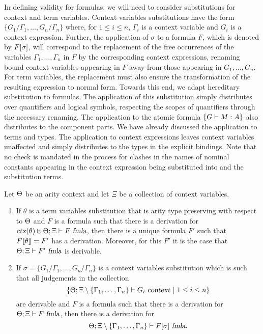 In defining validity for formulas, we will need to consider
substitutions for context and term variables.
%
Context variables substitutions have the form
$\{G_1/\Gamma_1,\ldots,G_n/\Gamma_n\}$ where, for $1 \leq i \leq n$,
$\Gamma_i$ is a context variable and $G_i$ is a context expression. 
%
Further, the application of $\sigma$ to a formula
$F$, which is denoted by $F[\sigma]$, will correspond to the 
replacement of the free occurrences of the variables
$\Gamma_1,\ldots,\Gamma_n$ in $F$ by the corresponding context
expressions, renaming bound context variables appearing in $F$ away
from those appearing in $G_1,\ldots,G_n$.
%
For term variables, the replacement must also ensure the
transformation of the resulting expression to normal form.
%
Towards this end, we adapt hereditary substitution to formulas.
%
The application of this substitution simply distributes over
quantifiers and logical symbols, respecting the scopes of quantifiers
through the necessary renaming.
%
The application to the atomic formula $\left\{G \vdash M:A\right\}$ also distributes
to the component parts.
%
We have already discussed the application to terms and types.
%
The application to context expressions leaves context variables
unaffected and simply distributes to the types in the explicit
bindings.
%
Note that no check is mandated in the process for clashes in the names
of nominal constants appearing in the context expression being
substituted into and the substitution terms. 
%


\begin{theorem}\label{th:subst-formula}
Let $\Theta$ be an arity context and let $\Xi$ be a collection of
context variables.
\begin{enumerate}
\item If $\theta$ is a term variables substitution that is arity type preserving with
respect to $\Theta$ and $F$ is a formula such that there is a
derivation for $\mbox{\sl ctx}(\theta) \uplus \Theta;\Xi \vdash F\ \mbox{\sl fmla}$,
then there is a unique formula $F'$ such that
$F\llbracket {\theta} \rrbracket_{} = F'$ has a derivation.
%
Moreover, for this $F'$ it is the case that
$\Theta;\Xi \vdash F'\ \mbox{\sl fmla}$ is derivable.  

\item If $\sigma=\{G_1/\Gamma_1,\ldots,G_n/\Gamma_n\}$ is a context variables
substitution which is such that all judgements in the collection
\[\left\{\wfctx{\STLCGamma}
             {\Xi\setminus\{\Gamma_1,\ldots,\Gamma_n\}}{G_i}\ |\ 
                    1\leq i\leq n\right\}\]
are derivable and $F$ is a formula such that there is a derivation for
$\Theta;\Xi \vdash F\ \mbox{\sl fmla}$, then there is a derivation for
\[\Theta;\Xi\setminus\{\Gamma_1,\ldots,\Gamma_n\} \vdash F[\sigma]\ \mbox{\sl fmla}.\]
\end{enumerate}
\end{theorem}

